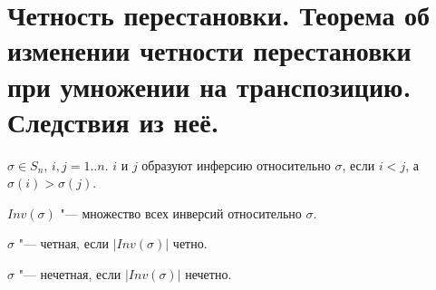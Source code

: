 \section{Четность перестановки. Теорема об изменении четности перестановки при умножении на транспозицию. Следствия из неё.}

\begin{Def}
$\sigma \in S_n$, $i, j = 1..n$. $i$ и $j$ образуют инферсию относительно $\sigma$, если $i < j$, а $\sigma(i) > \sigma(j)$.
\end{Def}
\begin{Def}
$Inv(\sigma)$ "--- множество всех инверсий относительно $\sigma$.
\end{Def}
\begin{Def}
$\sigma$ "--- четная, если $|Inv(\sigma)|$ четно.
\end{Def}
\begin{Def}
$\sigma$ "--- нечетная, если $|Inv(\sigma)|$ нечетно.
\end{Def}


